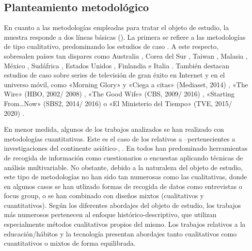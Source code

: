 \documentclass[spanish]{textolivre}
\begin{document}
\subsection{Planteamiento metodológico}
En cuanto a las metodologías empleadas para tratar el objeto de estudio, la muestra responde a dos líneas básicas (). La primera se refiere a las metodologías de tipo cualitativo, predominando los estudios de caso \cite{martinezcarazo2006}. A este respecto, sobresalen países tan dispares como Australia \cite{varan2013, goggin2012}, Corea del Sur \cite{shim2017, do2009}, Taiwan \cite{su2015}, Malasia \cite{wong2016}, México \cite{tamayofernandez2011}, Sudáfrica \cite{chuchu2014}, Estados Unidos \cite{dawson2012}, Finlandia \cite{jumiskopyykko2008} e Italia \cite{prario2007}. También destacan estudios de caso sobre series de televisión de gran éxito en Internet y en el universo móvil, como «Morning Glory» y «Ciega a citas» (Mediaset, 2014) \cite{alonso2015}, «The Wire» (HBO, 2002/ 2008) \cite{mittell2017}, «The Good Wife» (CBS, 2009/ 2016) \cite{hargraves2017}, «Starting From…Now» (SBS2, 2014/ 2016) \cite{monaghan2017} o «El Ministerio del Tiempo» (TVE, 2015/ 2020) \cite{scolari2017}. 

En menor medida, algunos de los trabajos analizados se han realizado con metodologías cuantitativas. Este es el caso de los relativos a \textcite{shim2017, wong2016, su2015} –pertenecientes a investigaciones del continente asiático-, \textcite{lochrie2012, chuchu2014, jumiskopyykko2008}. En todos han predominado herramientas de recogida de información como cuestionarios o encuestas aplicando técnicas de análisis multivariable. No obstante, debido a la naturaleza del objeto de estudio, este tipo de metodologías no han sido tan numerosas como las cualitativas, donde en algunos casos se han utlizado formas de recogida de datos como entrevistas o focus group, o se han combinado con diseños mixtos (cualitativos y cuantitativos). Según los diferentes abordajes del objeto de estudio, los trabajos más numerosos pertenecen al enfoque histórico-descriptivo, que utilizan especialmente métodos cualitativos propios del mismo. Los trabajos relativos a la educación/hábitos y la tecnología presentan abordajes tanto cualitativos como cuantitativos o mixtos de forma equilibrada.
\end{document}
